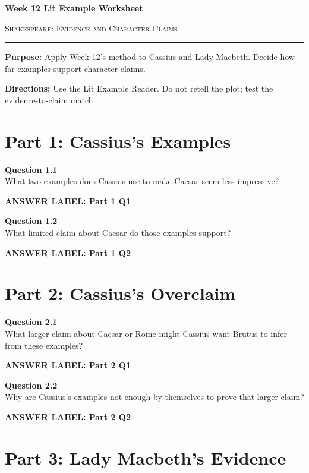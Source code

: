 \documentclass[12pt]{article}
\newcommand{\answerbox}[2]{%
\vspace{0.12em}
\noindent\textbf{#1}\par
\vspace{0.04em}
\noindent\fbox{%
\begin{minipage}[t][#2]{\dimexpr\textwidth-2\fboxsep-2\fboxrule}
\rule{\textwidth}{0pt}
\vspace{#2}
\end{minipage}}
\par\vspace{0.22em}}
\begin{document}
\begin{center}
{\LARGE\bfseries Week 12 Lit Example Worksheet}\par\vspace{0.05em}
{\large\scshape Shakespeare: Evidence and Character Claims}\par\vspace{0.12em}
\rule{0.78\textwidth}{0.5pt}
\end{center}

\textbf{Purpose:} Apply Week 12's method to Cassius and Lady Macbeth. Decide how far examples support character claims.

\textbf{Directions:} Use the Lit Example Reader. Do not retell the plot; test the evidence-to-claim match.

\section*{Part 1: Cassius's Examples}

\textbf{Question 1.1}\\[-0.15em]
What two examples does Cassius use to make Caesar seem less impressive?

\answerbox{ANSWER LABEL: Part 1 Q1}{1.95in}

\textbf{Question 1.2}\\[-0.15em]
What limited claim about Caesar do those examples support?

\answerbox{ANSWER LABEL: Part 1 Q2}{2.05in}

\newpage

\section*{Part 2: Cassius's Overclaim}

\textbf{Question 2.1}\\[-0.15em]
What larger claim about Caesar or Rome might Cassius want Brutus to infer from these examples?

\answerbox{ANSWER LABEL: Part 2 Q1}{2.25in}

\textbf{Question 2.2}\\[-0.15em]
Why are Cassius's examples not enough by themselves to prove that larger claim?

\answerbox{ANSWER LABEL: Part 2 Q2}{2.25in}

\newpage

\section*{Part 3: Lady Macbeth's Evidence}
\end{document}
